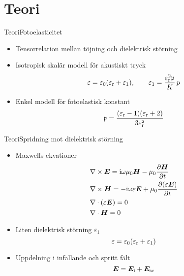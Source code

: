 \documentclass[11pt, final]{beamer}
\begin{document}
	\section{Teori}
	
	\begin{frame}{Teori}{Fotoelasticitet}
		\begin{itemize}
			\item Tensorrelation mellan töjning och dielektrisk störning
			\pause
			\item Isotropisk skalär modell för akustiskt tryck
			\begin{equation*}
				\varepsilon = \varepsilon_0 (\varepsilon_{\mathrm{r}} + \varepsilon_1), \qquad \varepsilon_1 = \frac{\varepsilon_{\mathrm{r}}^2 \mathfrak{p}}{K} \,p
			\end{equation*}
			\pause
			\item Enkel modell för fotoelastisk konstant
			\begin{equation*}
				\mathfrak{p} = \frac{(\varepsilon_{\mathrm{r}} - 1)(\varepsilon_{\mathrm{r}} + 2)}{3\varepsilon_{\mathrm{r}}^2}
			\end{equation*}
		\end{itemize}
	\end{frame}
	
	\begin{frame}{Teori}{Spridning mot dielektrisk störning}
		\begin{itemize}
			\item Maxwells ekvationer
			\begin{align*}
				&\nabla \times \bm{E} = \mathrm{i}\omega \mu_0 \bm{H} - \mu_0 \frac{\partial \bm{H}}{\partial t} \\
				&\nabla \times \bm{H} = -\mathrm{i}\omega \varepsilon \bm{E} + \mu_0 \frac{\partial (\varepsilon \bm{E})}{\partial t} \\
				&\nabla \cdot (\varepsilon \bm{E}) = 0 \\
				&\nabla \cdot \bm{H} = 0
			\end{align*}
			\pause
			\item Liten dielektrisk störning $\varepsilon_1$
			\begin{equation*}
				\varepsilon = \varepsilon_0(\varepsilon_{\mathrm{r}} + \varepsilon_1)
			\end{equation*}
			\pause
			\item Uppdelning i infallande och spritt fält
			\begin{equation*}
				\bm{E} = \bm{E}_{\mathrm{i}} + \bm{E}_{\mathrm{sc}}
			\end{equation*}
		\end{itemize}
	\end{frame}
	
\end{document}
